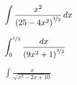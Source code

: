\documentclass[../mathNotesPreamble]{subfiles}
\begin{document}
  \begin{ex*}
    $\displaystyle \int \frac{x^2}{{\left(25-4x^2\right)}^{\nicefrac{3}{2}}}\,dx$
  \end{ex*}
  \pagebreak

  \begin{ex*}
    $\displaystyle \int_{0}^{\nicefrac{1}{3}} \frac{dx}{{\left(9x^2+1\right)}^{\nicefrac{3}{2}}}$
  \end{ex*}
  \pagebreak

  \begin{ex*}
    $\displaystyle \int \frac{x}{\sqrt{x^2-2x+10}}$
  \end{ex*}
  \pagebreak

  \pagebreak
\end{document}

